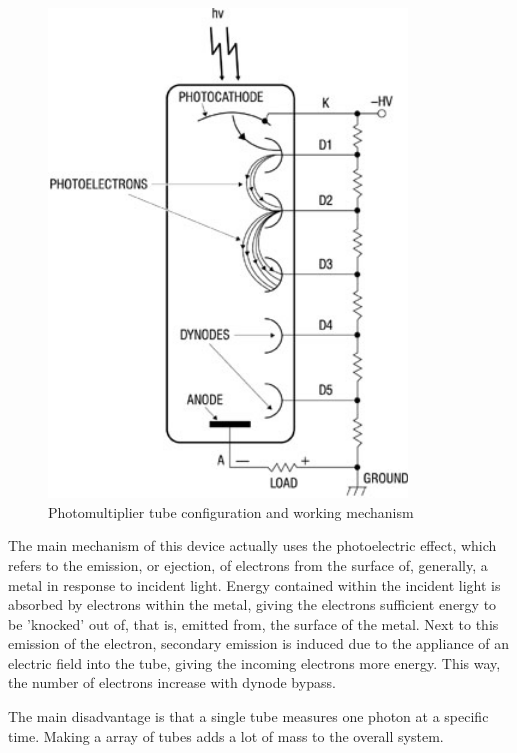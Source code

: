 \begin{enumerate}[i]
\begin{figure} [h]
	\begin{center}
\includegraphics[width=0.85\textwidth,angle=90]{chapters/img/DO_receiver1.jpg}	
\caption{Photomultiplier tube configuration and working mechanism}
\label{Photomultiplier}
\end{center}
\end{figure}

The main mechanism of this device actually uses the photoelectric effect, which refers to the emission, or ejection, of electrons from the surface of, generally, a metal in response to incident light. Energy contained within the incident light is absorbed by electrons within the metal, giving the electrons sufficient energy to be 'knocked' out of, that is, emitted from, the surface of the metal. Next to this emission of the electron, secondary emission is induced due to the appliance of an electric field into the tube, giving the incoming electrons more energy. This way, the number of electrons increase with dynode bypass. 

The main disadvantage is that a single tube measures one photon at a specific time. Making a array of tubes adds a lot of mass to the overall system. 


\end{enumerate}

